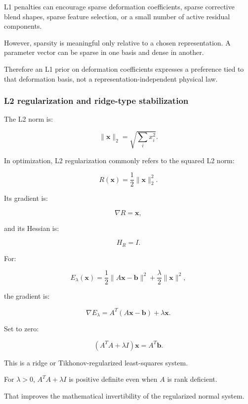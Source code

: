 \hypertarget{02-foundations-ii-ch027-graphics-applications}{}

L1 penalties can encourage sparse deformation coefficients, sparse corrective blend shapes, sparse feature selection, or a small number of active residual components.

However, sparsity is meaningful only relative to a chosen representation. A parameter vector can be sparse in one basis and dense in another.

Therefore an L1 prior on deformation coefficients expresses a preference tied to that deformation basis, not a representation-independent physical law.

\subsubsection{L2 regularization and ridge-type stabilization}\label{02-foundations-ii-ch027-l2-regularization-and-ridge-type-stabilization}

\hypertarget{02-foundations-ii-ch027-l2-regularization-and-ridge-type-stabilization}{}

The L2 norm is:

\[
\|\mathbf x\|_2= \sqrt{\sum_i x_i^2}.
\]

In optimization, L2 regularization commonly refers to the squared L2 norm:

\[
\boxed{ R(\mathbf x)=\frac12\|\mathbf x\|_2^2 }.
\]

Its gradient is:

\[
\nabla R=\mathbf x,
\]

and its Hessian is:

\[
H_R=I.
\]

For:

\[
E_\lambda(\mathbf x) = \frac12\|A\mathbf x-\mathbf b\|^2 +\frac\lambda2\|\mathbf x\|^2,
\]

the gradient is:

\[
\nabla E_\lambda = A^T(A\mathbf x-\mathbf b)+\lambda\mathbf x.
\]

Set to zero:

\[
\boxed{ (A^TA+\lambda I)\mathbf x=A^T\mathbf b }.
\]

This is a ridge or Tikhonov-regularized least-squares system.

For \(\lambda>0\), \(A^TA+\lambda I\) is positive definite even when \(A\) is rank deficient.

That improves the mathematical invertibility of the regularized normal system.

